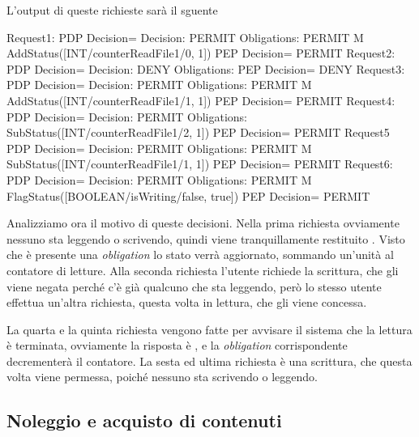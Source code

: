 L'output di queste richieste sarà il sguente
\begin{verbnobox}[\small]
 Request1:
	  PDP Decision=
 	  Decision: PERMIT 
 	  Obligations: PERMIT M AddStatus([INT/counterReadFile1/0, 1])
	  PEP Decision= PERMIT
 Request2:
	  PDP Decision=
 	  Decision: DENY Obligations: 
	  PEP Decision= DENY
 Request3:
	  PDP Decision=
 	  Decision: PERMIT 
 	  Obligations: PERMIT M AddStatus([INT/counterReadFile1/1, 1])
	  PEP Decision= PERMIT
 Request4:
	  PDP Decision=
 	  Decision: PERMIT
 	  Obligations: SubStatus([INT/counterReadFile1/2, 1])
	  PEP Decision= PERMIT
 Request5
	  PDP Decision=
 	  Decision: PERMIT
 	  Obligations: PERMIT M SubStatus([INT/counterReadFile1/1, 1])
	  PEP Decision= PERMIT
 Request6:
	  PDP Decision=
 	  Decision: PERMIT 
 	  Obligations: PERMIT M FlagStatus([BOOLEAN/isWriting/false, true])
	  PEP Decision= PERMIT
 \end{verbnobox}
Analizziamo ora il motivo di queste decisioni. Nella prima richiesta ovviamente nessuno sta leggendo o scrivendo, quindi viene tranquillamente restituito \permit. Visto che è presente una \textit{obligation} lo stato verrà aggiornato, sommando un'unità al contatore di letture.
Alla seconda richiesta l'utente richiede la scrittura, che gli viene negata perché c'è già qualcuno che sta leggendo, però lo stesso utente effettua un'altra richiesta, questa volta in lettura, che gli viene concessa.\\ \par
La quarta e la quinta richiesta vengono fatte per avvisare il sistema che la lettura è terminata, ovviamente la risposta è \permit, e la \textit{obligation} corrispondente decrementerà il contatore.
La sesta ed ultima richiesta è una scrittura, che questa volta viene permessa, poiché nessuno sta scrivendo o leggendo.



\subsection{Noleggio e acquisto di contenuti} %
\label{sub:secondo_esempio}


